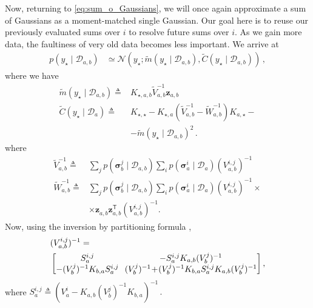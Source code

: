 \documentclass{article}
\newcommand{\given}{\ensuremath{\mid}}
\newcommand{\cm}[1]{\ensuremath{\mathcal{#1}}}
\newcommand{\bm}[1]{\ensuremath{\mathbf{#1}}}
\newcommand{\data}{\ensuremath{\cm{D}}}
\newcommand{\vect}[1]{\bm{#1}}
\newcommand{\vz}{\vect{z}}
\newcommand{\vs}{\vect{\sigma}}
\newcommand{\amean}[2]{\tilde{{m}}(#1 \given #2 )}
\newcommand{\acov}[2]{\tilde{{C}}(#1 \given #2 )}
\newcommand{\p}[2]{p(#1 \given #2 )}
\newcommand{\fPr}{p}
\newcommand{\Prob}[2]{\fPr(#1 \given #2 )}
\newcommand{\N}[3]{\cm{N}( #1;#2,#3 )}
\newcommand{\st}{_{\star}}
\newcommand{\tr}{\ensuremath{\mathsf{T}}}
\newcommand{\defequal}{\triangleq}
\begin{document}
Now, returning to \eqref{eq:sum_o_Gaussians}, we will once again
approximate a sum of Gaussians as a moment-matched single
Gaussian. Our goal here is to reuse our previously evaluated sums over
$i$ to resolve future sums over $i$. As we gain more data, the
faultiness of very old data becomes less important. We arrive at
\begin{align}
\p{y\st}{\data_{a,b}} & \simeq \N{y\st}{\amean{y\st}{\data_{a,b}}}{\acov{y\st}{\data_{a,b}}}\,,\label{eq:pyab}
\end{align}
where we have
\begin{align*}
\amean{y\st}{\data_{a,b}} \defequal {}&  K_{\star,a,b} \tilde{V}_{a,b}^{-1} \vz_{a,b}\label{eq:ameanab}\\
\acov{y\st}{\data_{a}}
\defequal {} & K_{\star,\star} - K_{\star,a}(\tilde{V}_{a,b}^{-1}-\tilde{W}_{a,b}^{-1})K_{a,\star} - {} \nonumber\\
& - \amean{y\st}{\data_{a,b}}^2 \,.\label{eq:acovab}
\end{align*}
where
\begin{align*}
\tilde{V}^{-1}_{a,b} \defequal {} &
\sum_{j} \Prob{\vs^j_{b}}{\data_{a,b}}\sum_i \Prob{\vs^i_{a}}{\data_{a}} (V_{a,b}^{i,j})^{-1} \\
\tilde{W}^{-1}_{a,b} \defequal {} &
\sum_{j} \Prob{\vs^j_{b}}{\data_{a,b}}\sum_i \Prob{\vs^i_{a}}{\data_{a}} (V_{a,b}^{i,j})^{-1}  \times {} \\
& \times \vz_{a,b}^{\phantom{\tr}} \vz_{a,b}^\tr (V_{a,b}^{i,j})^{-1}.
\end{align*}
Now, using the inversion by partitioning formula \citep[Section 2.7]
{NumericalRecipes},
\begin{align*}
\hspace{-0.2cm}&({V}^{i,j}_{a,b})^{-1} = \\
&\begin{bmatrix}
 S^{i,j}_a &\hspace{-0.1cm} -S^{i,j}_a K_{a,b} (V^j_b)^{-1} \\
 - (V^j_b)^{-1} K_{b,a} S^{i,j}_a &\hspace{-0.1cm} (V^j_b)^{-1}\!+\!(V^j_b)^{-1} K_{b,a} S^{i,j}_a K_{a,b} (V^j_b)^{-1} 
\end{bmatrix},
\end{align*}
where
$
S^{i,j}_a \defequal (V^i_a -K_{a,b} (V^j_b)^{-1}K_{b,a})^{-1}\,.
$
\end{document}
